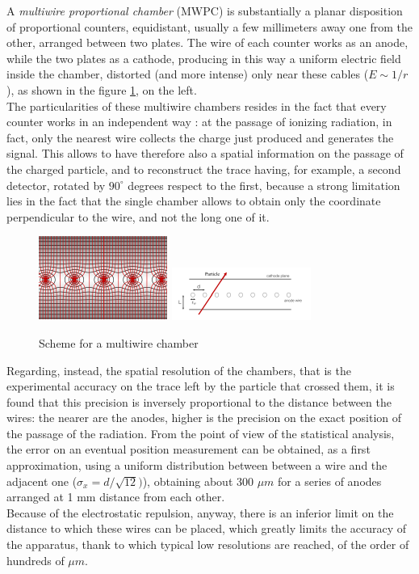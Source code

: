 \documentclass[a4paper,11pt]{book}
\begin{document}
A \textit{multiwire proportional chamber} (MWPC) is substantially a planar disposition of proportional counters, equidistant, usually a few millimeters away one from the other, arranged between two plates. The wire of each counter works as an anode, while the two plates as a cathode, producing in this way a uniform electric field inside the chamber, distorted (and more intense) only near these cables ($E \sim 1/r$), as shown in the figure \ref{fig:multiwire_scheme}, on the left.\\
The particularities of these multiwire chambers resides in the fact that every counter works in an independent way : at the passage of ionizing radiation, in fact, only the nearest wire collects the charge just produced and generates the signal. This allows to have therefore also a spatial information on the passage of the charged particle, and to reconstruct the trace having, for example, a second detector, rotated by $90^\circ$ degrees respect to the first, because a strong limitation lies in the fact that the single chamber allows to obtain only the coordinate perpendicular to the wire, and not the long one of it.\\

\begin{figure}[hbtp]
\centering
\includegraphics[scale = 2]{pictures/MWPC_electric_field.pdf} \qquad\qquad
\includegraphics[scale=3]{pictures/multiwire.pdf}
\caption{Scheme for a multiwire chamber}
\label{fig:multiwire_scheme}
\end{figure}

Regarding, instead, the spatial resolution of the chambers, that is the experimental accuracy on the trace left by the particle that crossed them, it is found that this precision is inversely proportional to the distance between the wires: the nearer are the anodes, higher is the precision on the exact position of the passage of the radiation. From the point of view of the statistical analysis, the error on an eventual position measurement can be obtained, as a first approximation, using a uniform distribution between between a wire and the adjacent one ($\sigma_x = d/\sqrt{12})$), obtaining about 300 $\mu m$ for a series of anodes arranged at 1 mm distance from each other.\\
Because of the electrostatic repulsion, anyway, there is an inferior limit on the distance to which these wires can be placed, which greatly limits the accuracy of the apparatus, thank to which typical low resolutions are reached, of the order of hundreds of $\mu m$.\\
\end{document}
